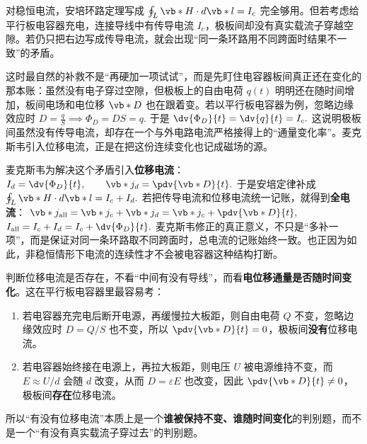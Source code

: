 对稳恒电流，安培环路定理写成
 \(\oint_L \vb*{H}\cdot d\vb*{l}=I_c\)
完全够用。但若考虑给平行板电容器充电，连接导线中有传导电流 \(I_c\)，极板间却没有真实载流子穿越空隙。若仍只把右边写成传导电流，就会出现“同一条环路用不同跨面时结果不一致”的矛盾。

这时最自然的补救不是“再硬加一项试试”，而是先盯住电容器板间真正还在变化的那本账：虽然没有电子穿过空隙，但极板上的自由电荷 \(q(t)\) 明明还在随时间增加，板间电场和电位移 \(\vb*{D}\) 也在跟着变。若以平行板电容器为例，忽略边缘效应时
 \(D=\frac{q}{S} \implies \Phi_D=DS=q.\)
于是
 \(\dv{\Phi_D}{t}=\dv{q}{t}=I_c.\)
这说明极板间虽然没有传导电流，却存在一个与外电路电流严格接得上的“通量变化率”。麦克斯韦引入位移电流，正是在把这份连续变化也记成磁场的源。

麦克斯韦为解决这个矛盾引入\textbf{位移电流}：
 \(I_d=\dv{\Phi_D}{t}, \qquad \vb*{j}_d=\pdv{\vb*{D}}{t}.\)
于是安培定律补成
 \(\oint_L \vb*{H}\cdot d\vb*{l}=I_c+I_d.\)
若把传导电流和位移电流统一记账，就得到\textbf{全电流}：
 \(\vb*{j}_{\mathrm{all}}=\vb*{j}_c+\vb*{j}_d =\vb*{j}_c+\pdv{\vb*{D}}{t},\)
 \(I_{\mathrm{all}}=I_c+I_d =I_c+\dv{\Phi_D}{t}.\)
麦克斯韦修正的真正意义，不只是“多补一项”，而是保证对同一条环路取不同跨面时，总电流的记账始终一致。也正因为如此，非稳恒情形下电流的连续性才不会被电容器这种结构打断。

\begin{note}
判断位移电流是否存在，不看“中间有没有导线”，而看\textbf{电位移通量是否随时间变化}。这在平行板电容器里最容易考：
\begin{enumerate}
 \item 若电容器充完电后断开电源，再缓慢拉大板距，则自由电荷 \(Q\) 不变，忽略边缘效应时 \(D=Q/S\) 也不变，所以 \(\pdv{\vb*{D}}{t}=0\)，极板间\textbf{没有}位移电流。
 \item 若电容器始终接在电源上，再拉大板距，则电压 \(U\) 被电源维持不变，而 \(E\approx U/d\) 会随 \(d\) 改变，从而 \(D=\varepsilon E\) 也改变，因此 \(\pdv{\vb*{D}}{t}\neq 0\)，极板间\textbf{存在}位移电流。
\end{enumerate}
所以“有没有位移电流”本质上是一个\textbf{谁被保持不变、谁随时间变化}的判别题，而不是一个“有没有真实载流子穿过去”的判别题。
\end{note}
